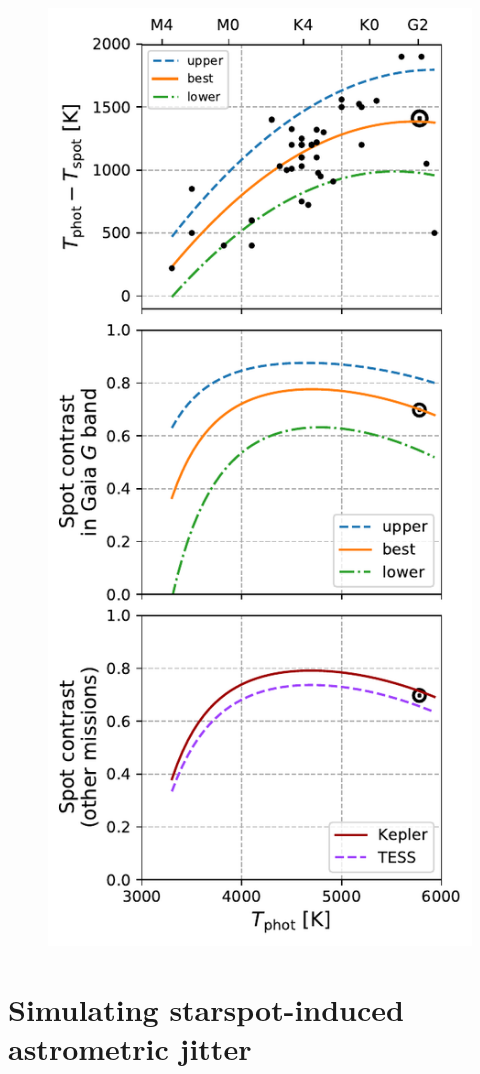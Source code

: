 \begin{figure}
\includegraphics[scale=0.8]{gaia/contrasts.pdf}
\end{figure}

\section{Simulating starspot-induced astrometric jitter} \label{sec:sim}

